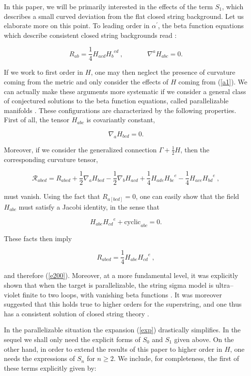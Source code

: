 \documentclass[a4paper,11pt]{article}
\begin{document}
In this paper, we will be primarily interested in the effects of the term 
$S_{1}$, which describes a small curved deviation from the flat closed 
string background. Let us elaborate more on this point. To leading order 
in $\alpha^{\prime}$, the beta function equations which describe consistent
closed string backgrounds read \cite{AFM, BCZ}:

\begin{equation}
R_{ab}=\frac{1}{4}H_{acd}{H_{b}}^{cd}\ ,\ \ \ \ \ \ \ \ \ \ \ \ \ \ \ \
\nabla ^{a}H_{abc}=0.
\label{e200}
\end{equation}

\noindent
If we work to first order in $H$, one may then neglect the presence of
curvature coming from the metric and only consider the effects of $H$
coming from (\ref{a1}). We can actually make these arguments more systematic
if we consider a general class of conjectured solutions to the beta 
function equations, called parallelizable manifolds \cite{BCZ}. These 
configurations are characterized by the following properties. First of all, 
the tensor $H_{abc}$ is covariantly constant,

$$
\nabla _{a}H_{bcd}=0.
$$

\noindent
Moreover, if we consider the generalized connection $\Gamma +\frac{1}{2}H$,
then the corresponding curvature tensor,

$$
\mathcal{R}_{abcd}=R_{abcd}+\frac{1}{2}\nabla_{a}H{}_{bcd}-\frac{1}{2}
\nabla_{b}H{}_{acd}+\frac{1}{4}H_{ade}{H_{bc}}^{e}-\frac{1}{4} 
H_{ace}{H_{bd}}^{e}\ ,
$$

\noindent
must vanish. Using the fact that $R_{a[bcd]}=0$, one can easily show that
the field $H_{abc}$ must satisfy a Jacobi identity, in the sense that 

$$
H_{abe}{H_{cd}}^{e}+\mathrm{cyclic}_{abc}=0.
$$

\noindent
These facts then imply 

$$
R_{abcd}=\frac{1}{4}H_{abe}{H_{cd}}^{e}\ ,
$$

\noindent
and therefore (\ref{e200}). Moreover, at a more fundamental level, it was
explicitly shown that when the target is parallelizable, the string sigma
model is ultra--violet finite to two loops, with vanishing beta 
functions \cite{BCZ}. It was moreover suggested that this holds true to 
higher orders for the superstring, and one thus has a consistent solution of 
closed string theory \cite{BCZ}.

In the parallelizable situation the expansion (\ref{exp}) drastically
simplifies. In the sequel we shall only need the explicit forms of $S_{0}$
and $S_{1}$ given above. On the other hand, in order to extend the results of 
this paper to higher order in $H$, one needs the expressions of $S_{n}$ for 
$n\geq 2$. We include, for completeness, the first of these terms explicitly
given by:
\end{document}
